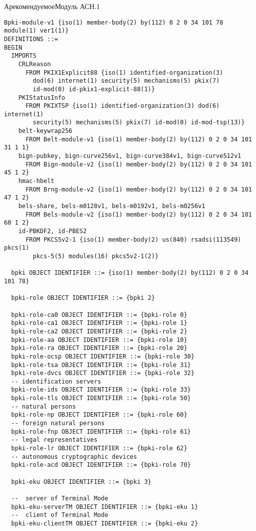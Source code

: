 \begin{appendix}{А}{рекомендуемое}{Модуль АСН.1}
\label{ASN1}

\mbox{}

\begin{verbatim}
Bpki-module-v1 {iso(1) member-body(2) by(112) 0 2 0 34 101 78 module(1) ver1(1)}
DEFINITIONS ::=
BEGIN
  IMPORTS
    CRLReason
      FROM PKIX1Explicit88 {iso(1) identified-organization(3)
        dod(6) internet(1) security(5) mechanisms(5) pkix(7)
        id-mod(0) id-pkix1-explicit-88(1)}
    PKIStatusInfo
      FROM PKIXTSP {iso(1) identified-organization(3) dod(6) internet(1)
        security(5) mechanisms(5) pkix(7) id-mod(0) id-mod-tsp(13)}
    belt-keywrap256
      FROM Belt-module-v1 {iso(1) member-body(2) by(112) 0 2 0 34 101 31 1 1}
    bign-pubkey, bign-curve256v1, bign-curve384v1, bign-curve512v1
      FROM Bign-module-v2 {iso(1) member-body(2) by(112) 0 2 0 34 101 45 1 2}
    hmac-hbelt
      FROM Brng-module-v2 {iso(1) member-body(2) by(112) 0 2 0 34 101 47 1 2}
    bels-share, bels-m0128v1, bels-m0192v1, bels-m0256v1
      FROM Bels-module-v2 {iso(1) member-body(2) by(112) 0 2 0 34 101 60 1 2}
    id-PBKDF2, id-PBES2
      FROM PKCS5v2-1 {iso(1) member-body(2) us(840) rsadsi(113549) pkcs(1) 
        pkcs-5(5) modules(16) pkcs5v2-1(2)}

  bpki OBJECT IDENTIFIER ::= {iso(1) member-body(2) by(112) 0 2 0 34 101 78}

  bpki-role OBJECT IDENTIFIER ::= {bpki 2}

  bpki-role-ca0 OBJECT IDENTIFIER ::= {bpki-role 0}
  bpki-role-ca1 OBJECT IDENTIFIER ::= {bpki-role 1}
  bpki-role-ca2 OBJECT IDENTIFIER ::= {bpki-role 2}
  bpki-role-aa OBJECT IDENTIFIER ::= {bpki-role 10}
  bpki-role-ra OBJECT IDENTIFIER ::= {bpki-role 20}
  bpki-role-ocsp OBJECT IDENTIFIER ::= {bpki-role 30}
  bpki-role-tsa OBJECT IDENTIFIER ::= {bpki-role 31}
  bpki-role-dvcs OBJECT IDENTIFIER ::= {bpki-role 32}
  -- identification servers
  bpki-role-ids OBJECT IDENTIFIER ::= {bpki-role 33}
  bpki-role-tls OBJECT IDENTIFIER ::= {bpki-role 50}
  -- natural persons
  bpki-role-np OBJECT IDENTIFIER ::= {bpki-role 60}
  -- foreign natural persons
  bpki-role-fnp OBJECT IDENTIFIER ::= {bpki-role 61}
  -- legal representatives
  bpki-role-lr OBJECT IDENTIFIER ::= {bpki-role 62}
  -- autonomous cryptographic devices
  bpki-role-acd OBJECT IDENTIFIER ::= {bpki-role 70}

  bpki-eku OBJECT IDENTIFIER ::= {bpki 3}

  --  server of Terminal Mode
  bpki-eku-serverTM OBJECT IDENTIFIER ::= {bpki-eku 1}
  --  client of Terminal Mode
  bpki-eku-clientTM OBJECT IDENTIFIER ::= {bpki-eku 2}


\end{verbatim}
\end{appendix}
